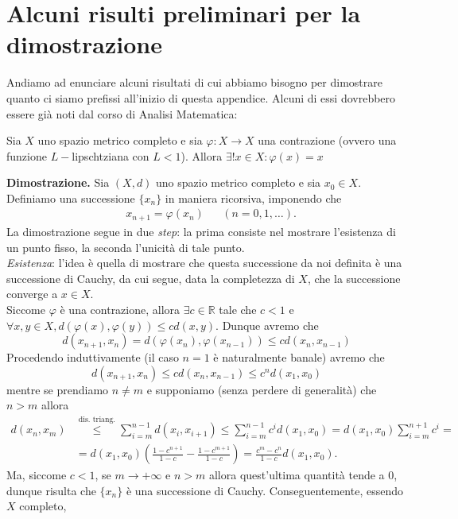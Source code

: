 \section{Alcuni risulti preliminari per la dimostrazione}
%
Andiamo ad enunciare alcuni risultati di cui abbiamo bisogno per dimostrare quanto ci siamo prefissi all'inizio di questa appendice. Alcuni di essi dovrebbero essere già noti dal corso di Analisi Matematica:
%
\vspace{0.5cm}
\begin{theorem}[\textcolor{blue}{di Banach-Caccioppoli}]
	Sia $X$ uno spazio metrico completo e sia $\varphi: X \to X$ una contrazione (ovvero una funzione $L-$lipschtziana con $L < 1$). Allora $\exists ! x \in X : \varphi(x) = x$
\end{theorem}
%
\noindent \textbf{Dimostrazione. }
	Sia $(X, d)$ uno spazio metrico completo e sia $x_0 \in X$. Definiamo una successione $\{ x_n \}$ in maniera ricorsiva, imponendo che
	\[\begin{aligned}
		&x_{n+1} = \varphi(x_n) & &(n = 0, 1, \ldots).
	\end{aligned}\]
	La dimostrazione segue in due \emph{step}: la prima consiste nel mostrare l'esistenza di un punto fisso, la seconda l'unicità di tale punto. \\
	\emph{Esistenza}: l'idea è quella di mostrare che questa successione da noi definita è una successione di Cauchy, da cui segue, data la completezza di $X$, che la successione converge a $x \in X$. \\
	Siccome $\varphi$ è una contrazione, allora $\exists c \in \mathbb{R}$ tale che $c < 1$ e $\forall x, y \in X, d(\varphi(x), \varphi(y)) \leq c d(x, y)$. Dunque avremo che
	\[
	d(x_{n+1}, x_n) = d(\varphi(x_n), \varphi(x_{n-1})) \leq c d(x_n, x_{n-1})
	\]
	Procedendo induttivamente (il caso $n=1$ è naturalmente banale) avremo che
	\[
	d(x_{n+1}, x_n) \leq c d(x_n, x_{n-1}) \leq c^n d(x_1, x_0)
	\]
	mentre se prendiamo $n \neq m$ e supponiamo (senza perdere di generalità) che $n > m$ allora
	\[\begin{aligned}
	d(x_n, x_m) &\stackrel{\text{dis. triang.}}{\leq} \sum_{i = m}^{n-1} d(x_i, x_{i+1}) \leq \sum_{i=m}^{n-1} c^{i} d(x_1, x_0) = d(x_1, x_0) \sum_{i=m}^{n+1} c^{i} = \\
	&= d(x_1, x_0) \left( \frac{1-c^{n+1}}{1-c} - \frac{1 - c^{m+1}}{1-c} \right) = \frac{c^{m} - c^{n}}{1-c} d(x_1, x_0).
	\end{aligned}\]
	Ma, siccome $c < 1$, se $m \to +\infty$ e $n > m$ allora quest'ultima quantità tende a $0$, dunque risulta che $\{ x_n \}$ è una successione di Cauchy. Conseguentemente, essendo $X$ completo,
